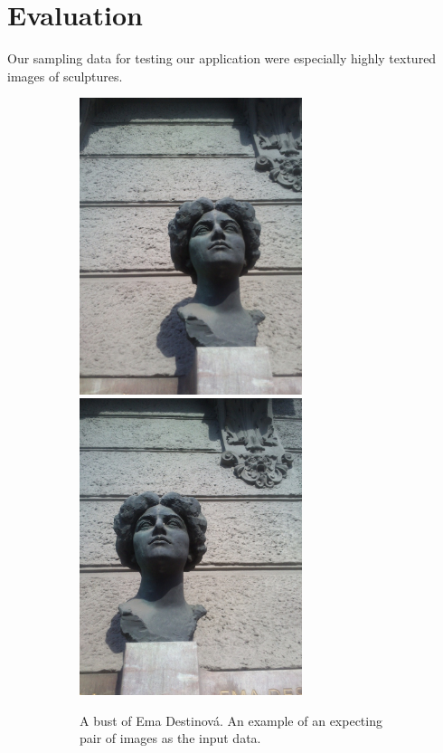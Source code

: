 \chapter{Evaluation}
\label{chap:eval}

Our sampling data for testing our application were especially highly textured images of sculptures.

\begin{figure}[H]
\centering
\begin{subfigure}[b]{0.45\textwidth}
\centering
\includegraphics[width=6.5cm]{img/ema_a.png}
\centering
\includegraphics[width=6.5cm]{img/ema_b.png}
\caption{A bust of Ema Destinová. An example of an expecting pair of images as the input data.} \label{sample1}
\end{subfigure}
\begin{subfigure}[b]{0.45\textwidth}
\centering

\end{subfigure}
\end{figure}
